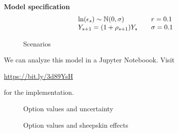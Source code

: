 \begin{frame}\textbf{Model specification}
\begin{align*}\begin{array}{l@{\qquad}l}
\ln(\epsilon_s) \sim \N(0, \sigma) & r = 0.1   \\
Y_{s + 1} = (1 + \rho_{s + 1}) Y_s & \sigma = 0.1 \\
\end{array}\end{align*}
\end{frame}
\begin{frame}
\begin{figure}[htp]\centering
\caption{Scenarios}
\end{figure}
\end{frame}
\begin{frame}
We can analyze this model in a Jupyter Noteboook. Visit
\begin{center}
\url{https://bit.ly/3d89YsH}
\end{center}
for the implementation.
\end{frame}
\begin{frame}
\begin{figure}[htp]\centering
\caption{Option values and uncertainty}
\end{figure}
\end{frame}
\begin{frame}
\begin{figure}[htp]\centering
\caption{Option values and sheepskin effects}
\end{figure}
\end{frame}
